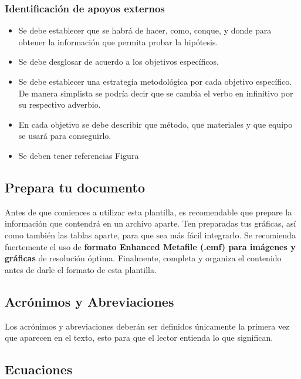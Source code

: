 \subsubsection{ Identificación de apoyos externos}

    \begin{itemize}
        \item Se debe establecer que se habrá de hacer, como, conque, y donde para obtener la información que permita probar la hipótesis.  
        \item Se debe desglosar de acuerdo a los objetivos específicos. 
        \item Se debe establecer una estrategia metodológica por cada objetivo específico. De manera simplista se podría decir que se cambia el verbo en infinitivo por su respectivo adverbio.
        \item En cada objetivo se debe describir que método, que materiales y que equipo se usará para conseguirlo.
        \item Se deben tener referencias Figura 
    \end{itemize}
    
    \subsection{Prepara tu documento}
    
    Antes de que comiences a utilizar esta plantilla, es recomendable que prepare la información que contendrá en un archivo aparte. 
    Ten preparadas tus gráficas, así como también las tablas aparte, para que sea más fácil integrarlo. 
    Se recomienda fuertemente el uso de \textbf{formato Enhanced Metafile (.emf) para imágenes y gráficas} de resolución óptima. 
    Finalmente, completa y organiza el contenido antes de darle el formato de esta plantilla. 
    
    \subsection{Acrónimos y Abreviaciones}
    
    Los acrónimos y abreviaciones deberán ser definidos únicamente la primera vez que aparecen en el texto, esto para que el lector entienda lo que significan.
    
    \subsection{Ecuaciones}
    
